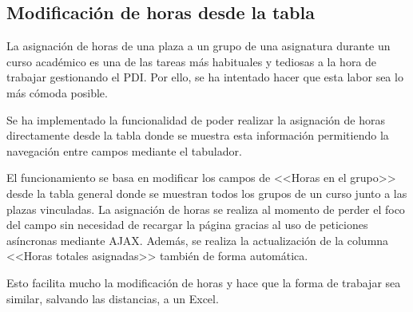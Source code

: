 \subsection{Modificación de horas desde la tabla}
La asignación de horas de una plaza a un grupo de una asignatura durante un curso académico es una de las tareas más habituales y tediosas a la hora de trabajar gestionando el PDI. 
Por ello, se ha intentado hacer que esta labor sea lo más cómoda posible.

Se ha implementado la funcionalidad de poder realizar la asignación de horas directamente desde la tabla donde se muestra esta información permitiendo la navegación entre campos mediante el tabulador.

El funcionamiento se basa en modificar los campos de <<Horas en el grupo>> desde la tabla general donde se muestran todos los grupos de un curso junto a las plazas vinculadas. 
La asignación de horas se realiza al momento de perder el foco del campo sin necesidad de recargar la página gracias al uso de peticiones asíncronas mediante AJAX.
Además, se realiza la actualización de la columna <<Horas totales asignadas>> también de forma automática.

Esto facilita mucho la modificación de horas y hace que la forma de trabajar sea similar, salvando las distancias, a un Excel.

